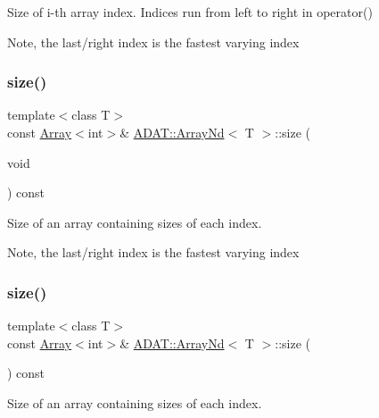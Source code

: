 Size of i-\/th array index. Indices run from left to right in operator() 

Note, the last/right index is the fastest varying index \mbox{\label{classADAT_1_1ArrayNd_a81494e519c7c5fae6e7ef2e2b46ba24b}} 
\subsubsection{\texorpdfstring{size()}{size()}\hspace{0.1cm}{\footnotesize\ttfamily [4/6]}}
{\footnotesize\ttfamily template$<$class T$>$ \\
const \mbox{\hyperlink{classXMLArray_1_1Array}{Array}}$<$int$>$\& \mbox{\hyperlink{classADAT_1_1ArrayNd}{A\+D\+A\+T\+::\+Array\+Nd}}$<$ T $>$\+::size (\begin{DoxyParamCaption}\item[{void}]{ }\end{DoxyParamCaption}) const\hspace{0.3cm}{\ttfamily [inline]}}



Size of an array containing sizes of each index. 

Note, the last/right index is the fastest varying index \mbox{\label{classADAT_1_1ArrayNd_a81494e519c7c5fae6e7ef2e2b46ba24b}} 
\subsubsection{\texorpdfstring{size()}{size()}\hspace{0.1cm}{\footnotesize\ttfamily [5/6]}}
{\footnotesize\ttfamily template$<$class T$>$ \\
const \mbox{\hyperlink{classXMLArray_1_1Array}{Array}}$<$int$>$\& \mbox{\hyperlink{classADAT_1_1ArrayNd}{A\+D\+A\+T\+::\+Array\+Nd}}$<$ T $>$\+::size (\begin{DoxyParamCaption}{ }\end{DoxyParamCaption}) const\hspace{0.3cm}{\ttfamily [inline]}}



Size of an array containing sizes of each index. 

